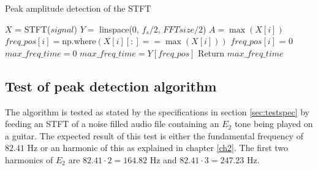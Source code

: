 \begin{algorithm}[H]
\caption{Peak amplitude detection of the STFT}
\label{alg:FIR}
\begin{algorithmic}[1]
\State  $X$ = STFT($signal$) 
\State $Y =$ linspace($0$, $f_s/2$, $FFTsize/2$) 
		\State $A = \max(X[i])$ 
		 
			\State $freq\_pos[i] = $np.where$(X[i][:] == \max(X[i]))$ 
		\Else
			\State $freq\_pos[i]$ = 0	
		\EndIf
			\State $max\_freq\_time = 0$
		\Else
			\State $max\_freq\_time = Y[freq\_pos]$
		\EndIf
	\EndFor
	\State Return $max\_freq\_time$
\EndProcedure
\end{algorithmic}
\end{algorithm}

\subsection{Test of peak detection algorithm}
The algorithm is tested as stated by the specifications in section \ref{sec:testspec} by feeding an STFT of a noise filled audio file containing an $E_2$ tone being played on a guitar.
The expected result of this test is either the fundamental frequency of $82.41$ Hz or an harmonic of this as explained in chapter \ref{ch2}. The first two harmonics of $E_2$ are $82.41 \cdot 2 = 164.82$ Hz and $82.41 \cdot 3 = 247.23$ Hz.

